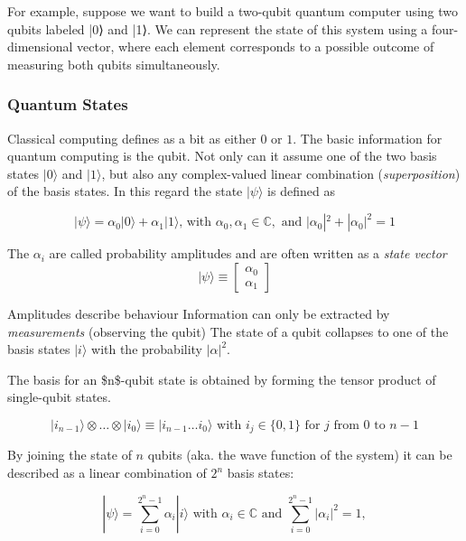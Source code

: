 \documentclass[11pt]{article}
\providecommand{\ket}[1]{|#1\rangle}
\newcommand{\myvec}[1]{\ensuremath{\begin{bmatrix}#1\end{bmatrix}}}
\theoremstyle{definition}
\theoremstyle{definition}
\begin{document}
For example, suppose we want to build a two-qubit quantum computer using two qubits labeled |0⟩ and |1⟩. We can represent the state of this system using a four-dimensional vector, where each element corresponds to a possible outcome of measuring both qubits simultaneously.
\subsubsection{Quantum States}
\label{sec:org3c733bf}
Classical computing defines as a bit as either \(0\) or \(1\).
The basic information for quantum computing is the qubit.
Not only can it assume one of the two basis states \(\ket{0}\) and \(\ket{1}\),
but also any complex-valued linear combination (\emph{superposition}) of the basis
states. In this regard the state \(\ket{\psi}\) is defined as


\begin{equation}
\ket{\psi} = \alpha_0 \ket{0} + \alpha_1 \ket{1} \text{, with } \alpha_0, \alpha_1 \in \mathbb{C}, \text{ and } |\alpha_0|^2 + |\alpha_0|^2 = 1
\end{equation}

The \(\alpha_i\) are called probability amplitudes and are often written as a \emph{state vector}
\begin{equation}
\ket{\psi} \equiv \myvec{\alpha_0 \\ \alpha_1}
\end{equation}

Amplitudes describe behaviour
Information can only be extracted by \emph{measurements} (observing the qubit)
The state of a qubit collapses to one of the basis states \(\ket{i}\) with the probability \(|\alpha|^2\).

The basis for an \$n\$-qubit state is obtained by forming the tensor product of single-qubit states.

\begin{equation}
\ket{i_{n-1}} \otimes \ldots \otimes \ket{i_0} \equiv \ket{i_{n-1} \ldots i_0} \text{ with } i_j \in \{0,1\} \text{ for } j \text{ from } 0 \text{ to } n - 1
\end{equation}

By joining the state of \(n\) qubits (aka. the wave function of the system)
it can be described as a linear combination of \(2^n\) basis states:

\begin{equation}
\ket{\psi} = \sum_{i = 0}^{2^n -1} \alpha_i \ket{i} \text{ with } \alpha_i \in \mathbb{C} \text{ and } \sum_{i = 0}^{2^n -1} |\alpha_i|^2 = 1,
\end{equation}
\end{document}
